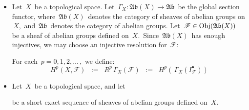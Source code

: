 \begin{itemize}
\item
	Let \,$X$\, be a topological space.
	Let \,$\Gamma_{X} : \mathfrak{Ab}(X) \longrightarrow \mathfrak{Ab}$\,
	be the global section functor,
	where  \,$\mathfrak{Ab}(X)$\, denotes the category of sheaves of abelian groups on \,$X$,\, and
	\,$\mathfrak{Ab}$\ denotes the category of abelian groups.
	\vskip 0.05cm
	Let \,$\mathscr{F} \in \textnormal{Obj}(\mathfrak{Ab}(X))$\, be a sheaf of abelian groups defined on \,$X$.\,
	Since \,$\mathfrak{Ab}(X)$\, has enough injectives, we may choose an injective resolution for \,$\mathscr{F}$:\,
	\begin{center}
	\end{center}
	For each \,$p = 0, 1, 2, \ldots$\,,\, we define:
	\begin{equation*}
	H^{p}(X,\mathscr{F})
	\;\; := \;\;
		R^{p}\,\Gamma_{X}(\mathscr{F})
	\;\; := \;\;
		H^{p}\!\left(\,\Gamma_{X}(I_{\mathscr{F}}^{\bullet})\right)
	\end{equation*}
	\vskip 0.3cm

\item
	Let \,$X$\, be a topological space, and let
	\begin{center}
	\end{center}
	be a short exact sequence of sheaves of abelian groups defined on \,$X$.\,

\end{itemize}


